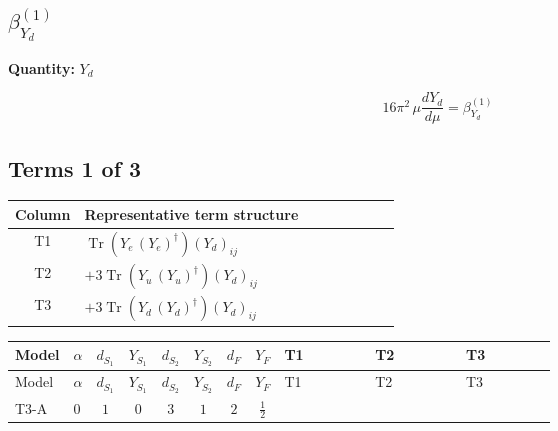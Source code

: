 \documentclass[8pt]{article}
\begin{document}
\begin{landscape}
\section*{$\beta_{Y_d}^{(1)}$}
\noindent\textbf{Quantity: }$Y_d$\par\smallskip
\[16\pi^2\,\mu\frac{d Y_d}{d\mu}=\beta_{Y_d}^{(1)}\]
\subsection*{Terms 1 of 3}
\begin{center}
\begin{tabular}{@{}c >{\raggedright\arraybackslash}p{0.82\linewidth}@{}}
\toprule
Column & Representative term structure \\
\midrule
T1 & \(\displaystyle \operatorname{Tr}\!\left({Y_e}\,\left({Y_e}\right)^{\dagger}\right) \left({Y_d}\right)_{ij}\) \\
\midrule
T2 & \(\displaystyle +3 \operatorname{Tr}\!\left({Y_u}\,\left({Y_u}\right)^{\dagger}\right) \left({Y_d}\right)_{ij}\) \\
\midrule
T3 & \(\displaystyle +3 \operatorname{Tr}\!\left({Y_d}\,\left({Y_d}\right)^{\dagger}\right) \left({Y_d}\right)_{ij}\) \\
\midrule
\bottomrule
\end{tabular}
\end{center}
\smallskip
\tiny
\begin{longtable}{@{}llcccccc >{\raggedright\arraybackslash}p{0.21\linewidth} >{\raggedright\arraybackslash}p{0.21\linewidth} >{\raggedright\arraybackslash}p{0.21\linewidth}@{}}
\toprule
Model & $\alpha$ & $d_{S_1}$ & $Y_{S_1}$ & $d_{S_2}$ & $Y_{S_2}$ & $d_F$ & $Y_F$ & T1 & T2 & T3 \\
\midrule
\endfirsthead
\toprule
Model & $\alpha$ & $d_{S_1}$ & $Y_{S_1}$ & $d_{S_2}$ & $Y_{S_2}$ & $d_F$ & $Y_F$ & T1 & T2 & T3 \\
\midrule
\endhead
T3-A & $0$ & $1$ & $0$ & $3$ & $1$ & $2$ & $\frac{1}{2}$ & \scriptsize\adjustbox{max width=\linewidth}{$\begin{gathered} \operatorname{Tr}\!\left({Y_e}\,\left({Y_e}\right)^{\dagger}\right) \left({Y_d}\right)_{ij}\end{gathered}$} & \scriptsize\adjustbox{max width=\linewidth}{$\begin{gathered} +3 \operatorname{Tr}\!\left({Y_u}\,\left({Y_u}\right)^{\dagger}\right) \left({Y_d}\right)_{ij}\end{gathered}$} & \scriptsize\adjustbox{max width=\linewidth}{$\begin{gathered} +3 \operatorname{Tr}\!\left({Y_d}\,\left({Y_d}\right)^{\dagger}\right) \left({Y_d}\right)_{ij}\end{gathered}$} \\

\end{longtable}
\end{landscape}
\end{document}
